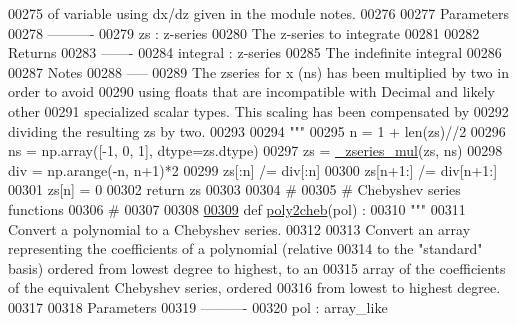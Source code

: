 \begin{DoxyCode}
00275 \textcolor{stringliteral}{    of variable using dx/dz given in the module notes.}
00276 \textcolor{stringliteral}{}
00277 \textcolor{stringliteral}{    Parameters}
00278 \textcolor{stringliteral}{    ----------}
00279 \textcolor{stringliteral}{    zs : z-series}
00280 \textcolor{stringliteral}{        The z-series to integrate}
00281 \textcolor{stringliteral}{}
00282 \textcolor{stringliteral}{    Returns}
00283 \textcolor{stringliteral}{    -------}
00284 \textcolor{stringliteral}{    integral : z-series}
00285 \textcolor{stringliteral}{        The indefinite integral}
00286 \textcolor{stringliteral}{}
00287 \textcolor{stringliteral}{    Notes}
00288 \textcolor{stringliteral}{    -----}
00289 \textcolor{stringliteral}{    The zseries for x (ns) has been multiplied by two in order to avoid}
00290 \textcolor{stringliteral}{    using floats that are incompatible with Decimal and likely other}
00291 \textcolor{stringliteral}{    specialized scalar types. This scaling has been compensated by}
00292 \textcolor{stringliteral}{    dividing the resulting zs by two.}
00293 \textcolor{stringliteral}{}
00294 \textcolor{stringliteral}{    """}
00295     n = 1 + len(zs)//2
00296     ns = np.array([-1, 0, 1], dtype=zs.dtype)
00297     zs = \hyperlink{namespacepyneb_1_1utils_1_1chebyshev_a46d958933482afac66ea41d143155dae}{\_zseries\_mul}(zs, ns)
00298     div = np.arange(-n, n+1)*2
00299     zs[:n] /= div[:n]
00300     zs[n+1:] /= div[n+1:]
00301     zs[n] = 0
00302     \textcolor{keywordflow}{return} zs
00303 
00304 \textcolor{comment}{#}
00305 \textcolor{comment}{# Chebyshev series functions}
00306 \textcolor{comment}{#}
00307 
00308 
\hypertarget{chebyshev_8py_source_l00309}{}\hyperlink{namespacepyneb_1_1utils_1_1chebyshev_a1f91018c86380adf38318e4e224279e7}{00309} \textcolor{keyword}{def }\hyperlink{namespacepyneb_1_1utils_1_1chebyshev_a1f91018c86380adf38318e4e224279e7}{poly2cheb}(pol) :
00310     \textcolor{stringliteral}{"""}
00311 \textcolor{stringliteral}{    Convert a polynomial to a Chebyshev series.}
00312 \textcolor{stringliteral}{}
00313 \textcolor{stringliteral}{    Convert an array representing the coefficients of a polynomial (relative}
00314 \textcolor{stringliteral}{    to the "standard" basis) ordered from lowest degree to highest, to an}
00315 \textcolor{stringliteral}{    array of the coefficients of the equivalent Chebyshev series, ordered}
00316 \textcolor{stringliteral}{    from lowest to highest degree.}
00317 \textcolor{stringliteral}{}
00318 \textcolor{stringliteral}{    Parameters}
00319 \textcolor{stringliteral}{    ----------}
00320 \textcolor{stringliteral}{    pol : array\_like}

\end{DoxyCode}
